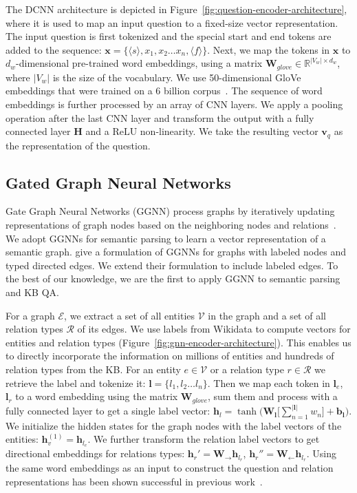 \documentclass[11pt]{article}
\begin{document}
The DCNN architecture is depicted in Figure~\ref{fig:question-encoder-architecture}, where it is used to map an input question to a fixed-size vector representation. The input question is first tokenized and the special start and end tokens are added to the sequence: $\mathbf{x} = \{\langle s \rangle, x_1, x_2 \ldots x_n, \langle f \rangle\}$.
Next, we map the tokens in $\mathbf{x}$ to $d_w$-dimensional pre-trained word embeddings, using a matrix $\mathbf{W_{\mathit{glove}}} \in \mathbb{R}^{|V_w| \times d_w}$, where $|V_w|$ is the size of the vocabulary. We use 50-dimensional GloVe embeddings that were trained on a 6 billion corpus~\cite{Pennington2014}. 
The sequence of word embeddings is further processed by an array of CNN layers. 
We apply a pooling operation after the last CNN layer and transform the output with a fully connected layer $\mathbf{H}$ and a $\mathrm{ReLU}$ non-linearity. We take the resulting vector $\mathbf{v}_q$ as the representation of the question.

\subsection{Gated Graph Neural Networks}
\label{sec:ggnn}

Gate Graph Neural Networks (GGNN) process graphs by iteratively updating representations of graph nodes based on the neighboring nodes and relations~\cite{Li2015b}.
We adopt GGNNs for semantic parsing to learn a vector representation of a semantic graph.  give a formulation of GGNNs for graphs with labeled nodes and typed directed edges. We extend their formulation to include labeled edges. To the best of our knowledge, we are the first to apply GGNN to semantic parsing and KB QA.

For a graph $\mathcal{E}$, we extract a set of all entities $\mathcal{V}$ in the graph and a set of all relation types $\mathcal{R}$ of its edges. We use labels from Wikidata to compute vectors for entities and relation types (Figure~\ref{fig:gnn-encoder-architecture}). This enables us to directly incorporate the information on millions of entities and hundreds of relation types from the KB.
For an entity $e \in \mathcal{V}$ or a relation type $r \in \mathcal{R}$ we retrieve the label and tokenize it: $\mathbf{l} = \{l_1, l_2 \ldots l_n\}$. Then we map each token in $\mathbf{l}_e$, $\mathbf{l}_r$  to a word embedding using the matrix $\mathbf{W_{\mathit{glove}}}$, sum them and process with a fully connected layer to get a single label vector: $\mathbf{h}_l = \tanh \big(\mathbf{W_l}\big[\sum_{n=1}^{|\mathbf{l}|} w_n \big] + \mathbf{b_l}  \big)$. We initialize the hidden states for the graph nodes with the label vectors of the entities: $\mathbf{h}_v^{(1)} = \mathbf{h}_{l_e}$. We further transform the relation label vectors to get directional embeddings for relations types: $\mathbf{h}_r' = \mathbf{W_{\rightarrow}} \mathbf{h}_{l_r}$, $\mathbf{h}_r'' = \mathbf{W_{\leftarrow}} \mathbf{h}_{l_r}$. Using the same word embeddings as an input to construct the question and relation representations has been shown successful in previous work~\cite{Jain}.
\end{document}
